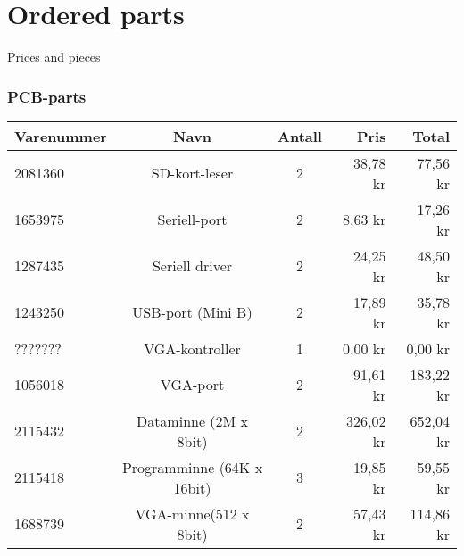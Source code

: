 \chapter{Ordered parts}
Prices and pieces
\subsection{PCB-parts}
\begin{tabular}{l | c | c | r | r}
Varenummer & Navn & Antall & Pris & Total \\ \hline
2081360	& SD-kort-leser & 2	& 38,78 kr & 77,56 kr \\ \hline
1653975 & Seriell-port & 2 & 8,63 kr & 17,26 kr \\ \hline
1287435	& Seriell driver &	2 & 24,25 kr & 48,50 kr \\ \hline
1243250	& USB-port (Mini B) &	2 & 17,89 kr &	35,78 kr \\ \hline
???????	& VGA-kontroller &	1 & 0,00 kr & 0,00 kr \\ \hline
1056018	& VGA-port	& 2 & 91,61 kr & 183,22 kr \\ \hline
2115432	& Dataminne (2M x 8bit) &	2 & 326,02 kr & 652,04 kr \\ \hline
2115418	& Programminne (64K x 16bit) &	3 & 19,85 kr & 59,55 kr \\ \hline
1688739	& VGA-minne(512 x 8bit) &	2 & 57,43 kr &114,86 kr \\ \hline
\end{tabular}
